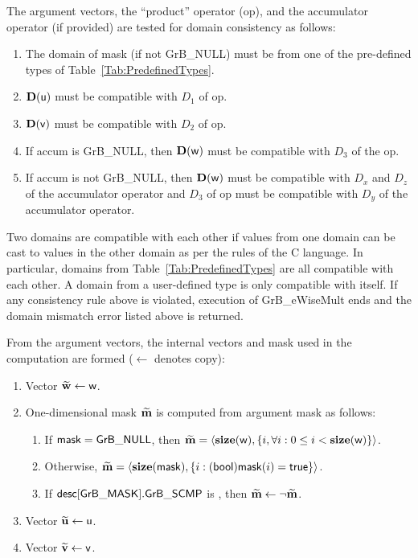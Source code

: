 The argument vectors, the ``product'' operator ({\sf op}), and the accumulator 
operator (if provided) are tested for domain consistency as follows:
\begin{enumerate}
	\item The domain of {\sf mask} (if not {\sf GrB\_NULL}) must be from one of the pre-defined types of Table~\ref{Tab:PredefinedTypes}.

	\item $\bold{D}({\sf u})$ must be compatible with $D_1$ of {\sf op}.

	\item $\bold{D}({\sf v})$ must be compatible with $D_2$ of {\sf op}.

	\item If {\sf accum} is {\sf GrB\_NULL}, then $\bold{D}({\sf w})$ must be 
    compatible with $D_3$ of the {\sf op}.

	\item If {\sf accum} is not {\sf GrB\_NULL}, then $\bold{D}({\sf w})$ must be
    compatible with $D_x$ and $D_z$ of the accumulator operator and $D_3$ of
    {\sf op} must be compatible with $D_y$ of the accumulator operator.
\end{enumerate}
Two domains are compatible with each other if values from one domain can be cast 
to values in the other domain as per the rules of the C language.
In particular, domains from Table~\ref{Tab:PredefinedTypes} are all compatible 
with each other. A domain from a user-defined type is only compatible with itself.
If any consistency rule above is violated, execution of {\sf GrB\_eWiseMult} ends
and the domain mismatch error listed above is returned.

From the argument vectors, the internal vectors and mask used in 
the computation are formed ($\leftarrow$ denotes copy):
\begin{enumerate}
	\item Vector ${\bf \widetilde{w}} \leftarrow {\sf w}$.

	\item One-dimensional mask ${\bf \widetilde{m}}$ is computed from 
    argument {\sf mask} as follows:
	\begin{enumerate}
		\item	If ${\sf mask} = {\sf GrB\_NULL}$, then ${\bf \widetilde{m}} = 
        \langle \bold{size}({\sf w}), \{i, \forall i : 0 \leq i < 
        \bold{size}({\sf w}) \} \rangle$.

		\item	Otherwise, ${\bf \widetilde{m}} = 
        \langle \bold{size}({\sf mask}), \{i : ({\sf bool}){\sf mask}(i) = 
        {\sf true}\} \rangle$.

		\item	If ${\sf desc[GrB\_MASK].GrB\_SCMP}$ is \true, then ${\bf \widetilde{m}} \leftarrow \neg {\bf \widetilde{m}}$.
	\end{enumerate}

	\item Vector ${\bf \widetilde{u}} \leftarrow {\sf u}$.

	\item Vector ${\bf \widetilde{v}} \leftarrow {\sf v}$.
\end{enumerate}

